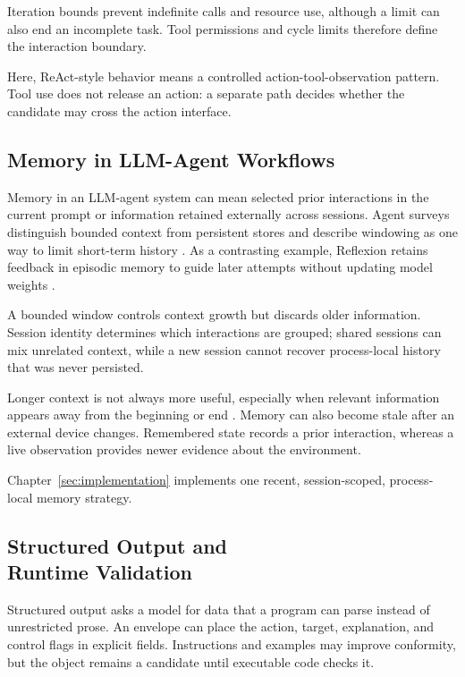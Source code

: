 Iteration bounds prevent indefinite calls and resource use, although a limit can
also end an incomplete task. Tool permissions and cycle limits therefore define
the interaction boundary.

Here, ReAct-style behavior means a controlled action-tool-observation pattern.
Tool use does not release an action: a separate path decides whether the candidate
may cross the action interface.

\subsection{Memory in LLM-Agent Workflows}\label{subsec:theory-memory}

Memory in an LLM-agent system can mean selected prior interactions in the current
prompt or information retained externally across sessions. Agent surveys
distinguish bounded context from persistent stores and describe windowing as one
way to limit short-term history \cite{wang2024surveyagents}. As a contrasting
example, Reflexion retains feedback in episodic memory to guide later attempts
without updating model weights \cite{shinn2023reflexion}.

A bounded window controls context growth but discards older information. Session
identity determines which interactions are grouped; shared sessions can mix
unrelated context, while a new session cannot recover process-local history that
was never persisted.

Longer context is not always more useful, especially when relevant information
appears away from the beginning or end \cite{liu2024lostmiddle}. Memory can also
become stale after an external device changes. Remembered state records a prior
interaction, whereas a live observation provides newer evidence about the
environment.

Chapter~\ref{sec:implementation} implements one recent, session-scoped,
process-local memory strategy.

\subsection[Structured Output and Runtime Validation]{Structured Output and\\Runtime Validation}\label{subsec:theory-validation}

Structured output asks a model for data that a program can parse instead of
unrestricted prose. An envelope can place the action, target, explanation, and
control flags in explicit fields. Instructions and examples may improve
conformity, but the object remains a candidate until executable code checks it.

